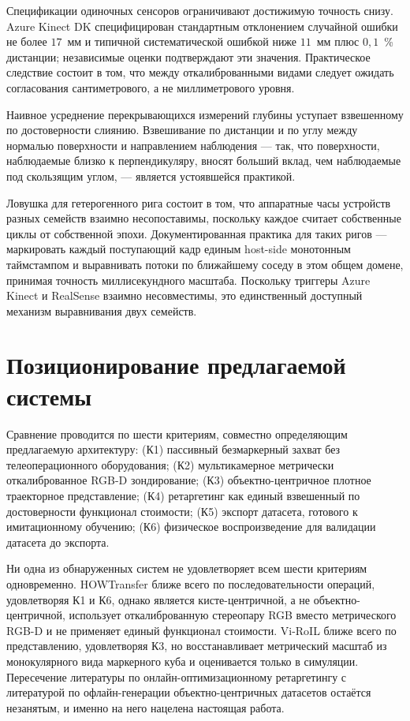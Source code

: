 \documentclass[12pt, a4paper, oneside]{report}
\begin{document}
Спецификации одиночных сенсоров ограничивают достижимую точность снизу. Azure
Kinect DK специфицирован стандартным отклонением случайной ошибки не более
$17$~мм и типичной систематической ошибкой ниже $11$~мм плюс $0{,}1$~\%
дистанции; независимые оценки подтверждают эти значения. Практическое следствие
состоит в том, что между откалиброванными видами следует ожидать согласования
сантиметрового, а не миллиметрового уровня.

Наивное усреднение перекрывающихся измерений глубины уступает взвешенному по
достоверности слиянию. Взвешивание по дистанции и по углу между нормалью
поверхности и направлением наблюдения --- так, что поверхности, наблюдаемые
близко к перпендикуляру, вносят больший вклад, чем наблюдаемые под скользящим
углом, --- является устоявшейся практикой.

Ловушка для гетерогенного рига состоит в том, что аппаратные часы устройств
разных семейств взаимно несопоставимы, поскольку каждое считает собственные
циклы от собственной эпохи. Документированная практика для таких ригов ---
маркировать каждый поступающий кадр единым host-side монотонным таймстампом и
выравнивать потоки по ближайшему соседу в этом общем домене, принимая точность
миллисекундного масштаба. Поскольку триггеры Azure Kinect и RealSense взаимно
несовместимы, это единственный доступный механизм выравнивания двух семейств.

\section{Позиционирование предлагаемой системы}

Сравнение проводится по шести критериям, совместно определяющим предлагаемую
архитектуру: (К1) пассивный безмаркерный захват без телеоперационного
оборудования; (К2) мультикамерное метрически откалиброванное RGB-D зондирование;
(К3) объектно-центричное плотное траекторное представление; (К4) ретаргетинг как
единый взвешенный по достоверности функционал стоимости; (К5) экспорт датасета,
готового к имитационному обучению; (К6) физическое воспроизведение для валидации
датасета до экспорта.

Ни одна из обнаруженных систем не удовлетворяет всем шести критериям
одновременно. HOWTransfer ближе всего по последовательности операций,
удовлетворяя К1 и К6, однако является кисте-центричной, а не
объектно-центричной, использует откалиброванную стереопару RGB вместо
метрического RGB-D и не применяет единый функционал стоимости. Vi-RoIL ближе
всего по представлению, удовлетворяя К3, но восстанавливает метрический масштаб
из монокулярного вида маркерного куба и оценивается только в симуляции.
Пересечение литературы по онлайн-оптимизационному ретаргетингу с литературой по
офлайн-генерации объектно-центричных датасетов остаётся незанятым, и именно на
него нацелена настоящая работа.
\end{document}
